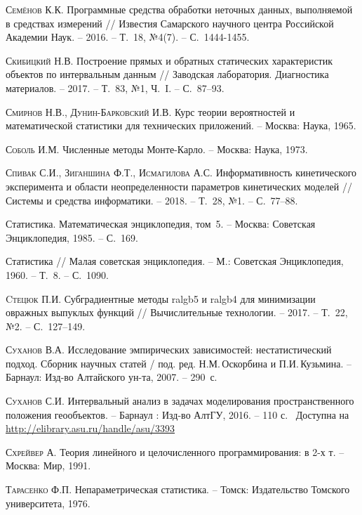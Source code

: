 \documentclass[a5paper,openany]{book}
\begin{document}
\begin{thebibliography}{999}
\textsc{Семёнов К.К.} Программные средства обработки неточных данных, выполняемой 
в средствах измерений // Известия Самарского научного центра Российской Академии Наук. 
-- 2016. -- Т.~18, №4(7). -- С.~1444-1455. 
  
\textsc{Скибицкий Н.В.} Построение прямых и обратных статических характеристик 
объектов по интервальным данным // Заводская лаборатория. Диагностика материалов. 
-- 2017. -- Т.~83, №1, Ч.~I. -- С.~87--93. 
  
\textsc{Смирнов Н.В., Дунин-Барковский И.В.} Курс теории вероятностей и математической 
статистики для технических приложений. -- Москва: Наука, 1965. 
  
\textsc{Соболь И.М.} Численные методы Монте-Карло. -- Москва: Наука, 1973. 
  
\textsc{Спивак С.И., Зиганшина Ф.Т., Исмагилова А.С.} Информативность кинетического 
эксперимента и области неопределенности параметров кинетических моделей // Системы 
и средства информатики. -- 2018. -- Т.~28, №1. -- С.~77--88. 
  
Статистика. Математическая энциклопедия, том~5. -- Москва: Советская Энциклопедия, 1985. 
-- С.~169. 
  
Статистика // Малая советская энциклопедия. -- М.: Советская Энциклопедия, 1960. 
-- Т.~8. -- С.~1090. 
  
\textsc{Cтецюк П.И.} Субградиентные методы ralgb5 и ralgb4 для минимизации овражных 
выпуклых функций // Вычислительные технологии. -- 2017. -- Т.~22, №2. -- С.~127--149. 
  
\textsc{Суханов В.А.} Исследование  эмпирических  зависимостей:  нестатистический подход.  
Сборник научных статей / под. ред. Н.М.\,Оскорбина и П.И.\,Кузьмина.  -- Барнаул: Изд-во 
Алтайского ун-та, 2007. -- 290~с. 
  
\textsc{Суханов С.И.} Интервальный анализ в задачах моделирования пространственного 
положения геообъектов. -- Барнаул : Изд-во АлтГУ, 2016. -- 110 с. \ 
Доступна на \url{http://elibrary.asu.ru/handle/asu/3393} 
  
\textsc{Схрейвер А.} Теория линейного и целочисленного программирования: в 2-х т.  
-- Москва: Мир, 1991. 
  
\textsc{Тарасенко Ф.П.} Непараметрическая статистика. -- Томск: Издательство Томского 
университета, 1976. 


\end{thebibliography}
\end{document}
